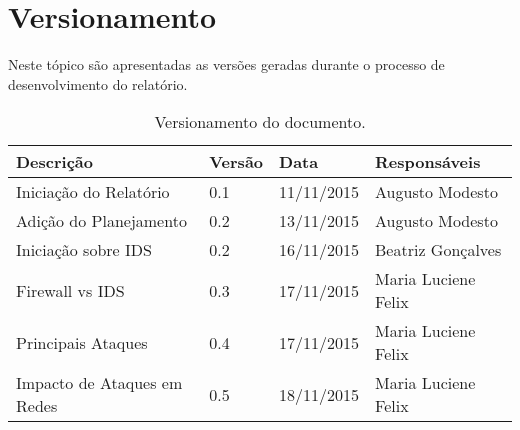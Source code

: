 \chapter[Versionamento]{Versionamento}
\label{chap:versionamento}
	Neste tópico são apresentadas as versões geradas durante o processo de desenvolvimento do relatório.
	
	\label{subsubsec:versionamento_talbe}
		\begin{table}[h]
			\centering
			\begin{tabular}{|p{6cm}|p{1.5cm}|p{2.5cm}|p{4cm}|}
				
				\hline
				
				Descrição & Versão & Data & Responsáveis \\ \hline
				Iniciação do Relatório & 0.1 & 11/11/2015 & Augusto Modesto \\ \hline
				Adição do Planejamento & 0.2 & 13/11/2015 & Augusto Modesto \\ \hline
				Iniciação sobre IDS & 0.2 & 16/11/2015 & Beatriz Gonçalves \\ \hline
				Firewall vs IDS & 0.3 & 17/11/2015 & Maria Luciene Felix \\ \hline
				Principais Ataques & 0.4 & 17/11/2015 & Maria Luciene Felix \\ \hline
				Impacto de Ataques em Redes & 0.5 & 18/11/2015 & Maria Luciene Felix \\ \hline
				




				
			\end{tabular}
			\caption[Versionamento do Documento]{Versionamento do documento.}
			\label{tab:versionamento_tabl}
		\end{table}
